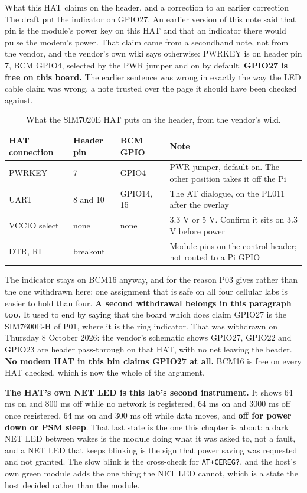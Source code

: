 \begin{note}{What this HAT claims on the header, and a correction to an earlier correction}
The draft put the indicator on GPIO27. An earlier version of this note said that pin is the module's power key on this HAT and that an indicator there would pulse the modem's power. That claim came from a secondhand note, not from the vendor, and the vendor's own wiki says otherwise: PWRKEY is on header pin 7, BCM GPIO4, selected by the PWR jumper and on by default. \textbf{GPIO27 is free on this board.} The earlier sentence was wrong in exactly the way the LED cable claim was wrong, a note trusted over the page it should have been checked against.

\begin{table}[H]\centering\small
\begin{tabular}{p{34mm}p{26mm}p{20mm}p{56mm}}
\toprule
HAT connection & Header pin & BCM GPIO & Note \\
\midrule
PWRKEY & 7 & GPIO4 & PWR jumper, default on. The other position takes it off the Pi \\
UART & 8 and 10 & GPIO14, 15 & The AT dialogue, on the PL011 after the overlay \\
VCCIO select & none & none & 3.3 V or 5 V. Confirm it sits on 3.3 V before power \\
DTR, RI & breakout & & Module pins on the control header; not routed to a Pi GPIO \\
\bottomrule
\end{tabular}
\caption{What the SIM7020E HAT puts on the header, from the vendor's wiki.}
\end{table}

The indicator stays on BCM16 anyway, and for the reason P03 gives rather than the one withdrawn here: one assignment that is safe on all four cellular labs is easier to hold than four. \textbf{A second withdrawal belongs in this paragraph too.} It used to end by saying that the board which does claim GPIO27 is the SIM7600E-H of P01, where it is the ring indicator. That was withdrawn on Thursday 8 October 2026: the vendor's schematic shows GPIO27, GPIO22 and GPIO23 are header pass-through on that HAT, with no net leaving the header. \textbf{No modem HAT in this bin claims GPIO27 at all.} BCM16 is free on every HAT checked, which is now the whole of the argument.

\textbf{The HAT's own NET LED is this lab's second instrument.} It shows 64 ms on and 800 ms off while no network is registered, 64 ms on and 3000 ms off once registered, 64 ms on and 300 ms off while data moves, and \textbf{off for power down or PSM sleep}. That last state is the one this chapter is about: a dark NET LED between wakes is the module doing what it was asked to, not a fault, and a NET LED that keeps blinking is the sign that power saving was requested and not granted. The slow blink is the cross-check for \texttt{AT+CEREG?}, and the host's own green module adds the one thing the NET LED cannot, which is a state the host decided rather than the module.
\end{note}

